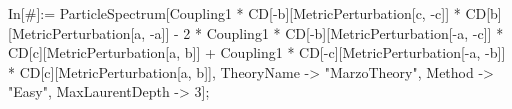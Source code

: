 In[#]:= ParticleSpectrum[Coupling1 * CD[-b][MetricPerturbation[c, -c]] * CD[b][MetricPerturbation[a, -a]] - 2 * Coupling1 * CD[-b][MetricPerturbation[-a, -c]] * CD[c][MetricPerturbation[a, b]] + Coupling1 * CD[-c][MetricPerturbation[-a, -b]] * CD[c][MetricPerturbation[a, b]], TheoryName -> "MarzoTheory", Method -> "Easy", MaxLaurentDepth -> 3]; 